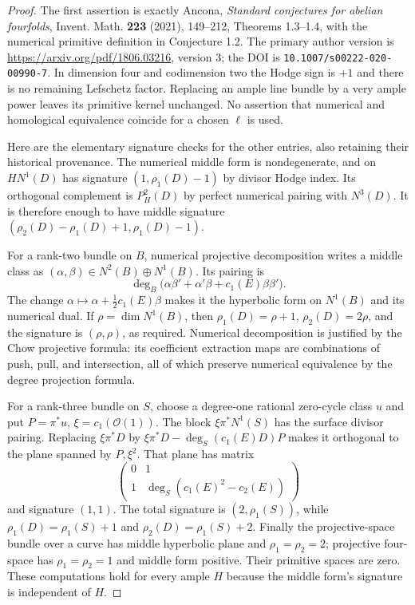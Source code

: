 \begin{proof}
The first assertion is exactly Ancona,
\emph{Standard conjectures for abelian fourfolds},
Invent. Math. \textbf{223} (2021), 149--212,
Theorems 1.3--1.4, with the numerical primitive definition in
Conjecture 1.2. The primary author version is
\url{https://arxiv.org/pdf/1806.03216}, version 3;
the DOI is \texttt{10.1007/s00222-020-00990-7}.
In dimension four and codimension two the Hodge sign is $+1$
and there is no remaining Lefschetz factor. Replacing an ample
line bundle by a very ample power leaves its primitive kernel
unchanged. No assertion that numerical and homological equivalence
coincide for a chosen $\ell$ is used.

Here are the elementary signature checks for the other entries,
also retaining their historical provenance. The numerical middle
form is nondegenerate, and on $H N^1(D)$ has signature
$(1,\rho_1(D)-1)$ by divisor Hodge index. Its orthogonal complement
is $P_H^2(D)$ by perfect numerical pairing with $N^3(D)$.
It is therefore enough to have middle signature
$(\rho_2(D)-\rho_1(D)+1,\rho_1(D)-1)$.

For a rank-two bundle on $B$, numerical projective decomposition
writes a middle class as $(\alpha,\beta)\in N^2(B)\oplus N^1(B)$.
Its pairing is
\[
 \deg_B\bigl(\alpha\beta'+\alpha'\beta+c_1(E)\beta\beta'\bigr).
\]
The change $\alpha\mapsto\alpha+\frac12c_1(E)\beta$ makes it
the hyperbolic form on $N^1(B)$ and its numerical dual.
If $\rho=\dim N^1(B)$, then
$\rho_1(D)=\rho+1$, $\rho_2(D)=2\rho$, and the signature is
$(\rho,\rho)$, as required. Numerical decomposition is justified
by the Chow projective formula: its coefficient extraction maps
are combinations of push, pull, and intersection, all of which
preserve numerical equivalence by the degree projection formula.

For a rank-three bundle on $S$, choose a degree-one rational
zero-cycle class $u$ and put $P=\pi^*u$, $\xi=c_1(\mathcal O(1))$.
The block $\xi\pi^*N^1(S)$ has the surface divisor pairing.
Replacing $\xi\pi^*D$ by
$\xi\pi^*D-\deg_S(c_1(E)D)P$ makes it orthogonal to
the plane spanned by $P,\xi^2$. That plane has matrix
\[
 \begin{pmatrix}0&1\\1&\deg_S(c_1(E)^2-c_2(E))\end{pmatrix}
\]
and signature $(1,1)$. The total signature is $(2,\rho_1(S))$,
while $\rho_1(D)=\rho_1(S)+1$ and $\rho_2(D)=\rho_1(S)+2$.
Finally the projective-space bundle over a curve has middle
hyperbolic plane and $\rho_1=\rho_2=2$; projective four-space
has $\rho_1=\rho_2=1$ and middle form positive. Their primitive
spaces are zero. These computations hold for every ample $H$
because the middle form's signature is independent of $H$.


\end{proof}
